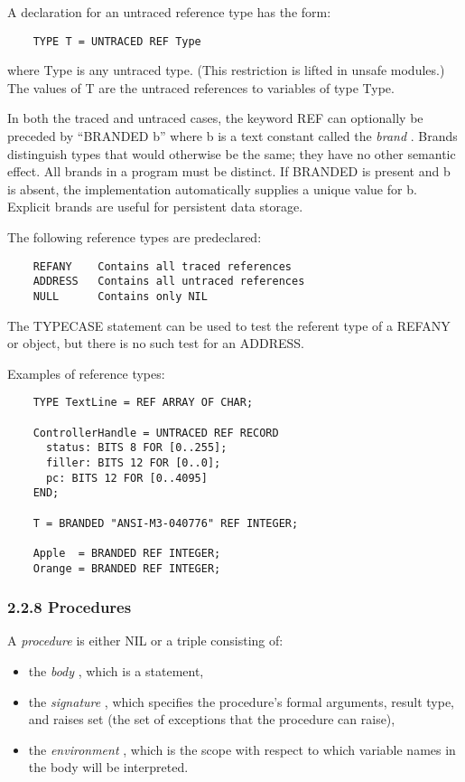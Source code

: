 \documentclass[10pt]{article}
\begin{document}
A declaration for an untraced reference type has the form:
\begin{verbatim}
    TYPE T = UNTRACED REF Type
\end{verbatim}
where Type is any untraced type.  (This restriction is lifted in unsafe
modules.) The values of T are the untraced references to variables of type
Type.

In both the traced and untraced cases, the keyword REF can optionally be
preceded by ``BRANDED b'' where b is a text constant called the \emph{brand}
.  Brands distinguish types that would otherwise be the same; they have no
other semantic effect.  All brands in a program must be distinct.  If BRANDED is
present and b is absent, the implementation automatically supplies a unique
value for b.  Explicit brands are useful for persistent data storage.

The following reference types are predeclared:
\begin{verbatim}
    REFANY    Contains all traced references
    ADDRESS   Contains all untraced references
    NULL      Contains only NIL
\end{verbatim}
The TYPECASE statement can be used to test the referent type of a REFANY or
object, but there is no such test for an ADDRESS.

Examples of reference types:
\begin{verbatim}
    TYPE TextLine = REF ARRAY OF CHAR;

    ControllerHandle = UNTRACED REF RECORD
      status: BITS 8 FOR [0..255];
      filler: BITS 12 FOR [0..0];
      pc: BITS 12 FOR [0..4095]
    END;

    T = BRANDED "ANSI-M3-040776" REF INTEGER;

    Apple  = BRANDED REF INTEGER;
    Orange = BRANDED REF INTEGER;
\end{verbatim}

\subsubsection*{2.2.8 Procedures}

A \emph{procedure} is either NIL or a triple consisting of:
\begin{itemize}
\item the \emph{body} , which is a statement,
\item the \emph{signature} , which specifies the procedure's formal arguments,
  result type, and raises set (the set of exceptions that the procedure can
  raise),
\item the \emph{environment} , which is the scope with respect to which
  variable names in the body will be interpreted.
\end{itemize}
\end{document}
